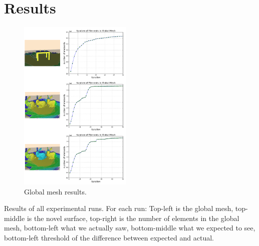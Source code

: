 \section{Results} \label{sec:results}

\begin{figure}[h]%
\centering
\includegraphics[width=0.48\textwidth]{figures/diagram_run123_gm.png}
\caption{Global mesh results.}
\label{fig:run1d}
\end{figure}

Results of all experimental runs. For each run: Top-left is the global mesh,
top-middle is the novel surface, top-right is the number of elements in the
global mesh, bottom-left what we actually saw, bottom-middle what we expected to
see, bottom-left threshold of the difference between expected and actual.
